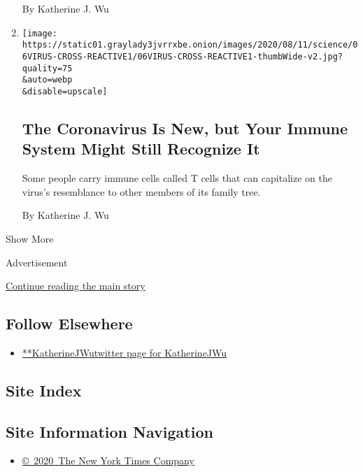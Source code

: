 \begin{enumerate}
  By Katherine J. Wu
\item
  \href{/2020/08/06/health/coronavirus-immune-cells.html}{}

  \texttt{[image: https://static01.graylady3jvrrxbe.onion/images/2020/08/11/science/06VIRUS-CROSS-REACTIVE1/06VIRUS-CROSS-REACTIVE1-thumbWide-v2.jpg?quality=75\\\&auto=webp\\\&disable=upscale]}

  \hypertarget{the-coronavirus-is-new-but-your-immune-system-might-still-recognize-it}{%
  \subsection{The Coronavirus Is New, but Your Immune System Might Still
  Recognize
  It}\label{the-coronavirus-is-new-but-your-immune-system-might-still-recognize-it}}

  Some people carry immune cells called T cells that can capitalize on
  the virus's resemblance to other members of its family tree.

  By Katherine J. Wu
\end{enumerate}

Show More

Advertisement

\protect\hyperlink{after-mid2}{Continue reading the main story}

\hypertarget{follow-elsewhere}{%
\subsection{Follow Elsewhere}\label{follow-elsewhere}}

\begin{itemize}
\tightlist
\item
  \href{https://twitter.com/KatherineJWu}{**KatherineJWutwitter page for
  KatherineJWu}
\end{itemize}

\hypertarget{site-index}{%
\subsection{Site Index}\label{site-index}}

\hypertarget{site-information-navigation}{%
\subsection{Site Information
Navigation}\label{site-information-navigation}}

\begin{itemize}
\tightlist
\item
  \href{https://help.nytimes3xbfgragh.onion/hc/en-us/articles/115014792127-Copyright-notice}{©~2020~The
  New York Times Company}
\end{itemize}

